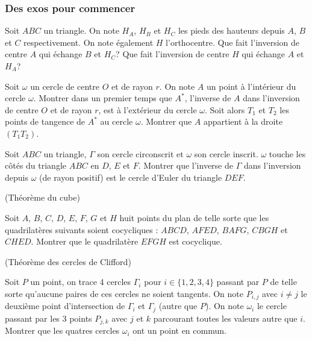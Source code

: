 \subsubsection{Des exos pour commencer}

\begin{exo}

Soit $ABC$ un triangle. On note $H_A$, $H_B$ et $H_C$ les pieds des hauteurs depuis $A$, $B$ et $C$ respectivement. On note également $H$ l'orthocentre. Que fait l'inversion de centre $A$ qui échange $B$ et $H_C$? Que fait l'inversion de centre $H$ qui échange $A$ et $H_A$? 
\end{exo}

\begin{exo}

Soit $\omega$ un cercle de centre $O$ et de rayon $r$. On note $A$ un point à l'intérieur du cercle $\omega$. Montrer dans un premier temps que $A^*$, l'inverse de $A$ dans l'inversion de centre $O$ et de rayon $r$, est à l'extérieur du cercle $\omega$. Soit alors $T_1$ et $T_2$ les points de tangence de $A^*$ au cercle $\omega$. Montrer que $A$ appartient à la droite $(T_1T_2)$.
\end{exo}

\begin{exo}

Soit $ABC$ un triangle, $\Gamma$ son cercle circonscrit et $\omega$ son cercle inscrit. $\omega$ touche les côtés du triangle $ABC$ en $D$, $E$ et $F$. Montrer que l'inverse de $\Gamma$ dans l'inversion depuis $\omega$ (de rayon positif) est le cercle d'Euler du triangle $DEF$.
\end{exo}

\begin{exo}(Théorème du cube)

Soit $A$, $B$, $C$, $D$, $E$, $F$, $G$ et $H$ huit points du plan de telle sorte que les quadrilatères suivants soient cocycliques : $ABCD$, $AFED$, $BAFG$, $CBGH$ et $CHED$. Montrer que le quadrilatère $EFGH$ est cocyclique. 
\end{exo}

\begin{exo}(Théorème des cercles de Clifford)

Soit $P$ un point, on trace 4 cercles $\Gamma_i$ pour $i \in \{1,2, 3, 4\}$ passant par $P$ de telle sorte qu'aucune paires de ces cercles ne soient tangents. On note $P_{i,j}$ avec $i\neq j$ le deuxième point d'intersection de $\Gamma_i$ et $\Gamma_j$ (autre que $P$). On note $\omega_i$ le cercle passant par les 3 points $P_{j,k}$ avec $j$ et $k$ parcourant toutes les valeurs autre que $i$. Montrer que les quatres cercles $\omega_i$ ont un point en commun.
\end{exo}


